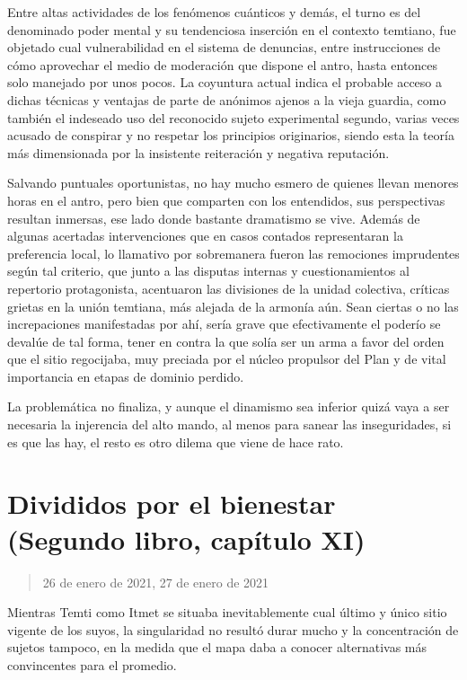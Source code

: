 \documentclass[
]{book}
\begin{document}
Entre altas actividades de los fenómenos cuánticos y demás, el turno es del denominado poder mental y su tendenciosa inserción en el contexto temtiano, fue objetado cual vulnerabilidad en el sistema de denuncias, entre instrucciones de cómo aprovechar el medio de moderación que dispone el antro, hasta entonces solo manejado por unos pocos. La coyuntura actual indica el probable acceso a dichas técnicas y ventajas de parte de anónimos ajenos a la vieja guardia, como también el indeseado uso del reconocido sujeto experimental segundo, varias veces acusado de conspirar y no respetar los principios originarios, siendo esta la teoría más dimensionada por la insistente reiteración y negativa reputación.

Salvando puntuales oportunistas, no hay mucho esmero de quienes llevan menores horas en el antro, pero bien que comparten con los entendidos, sus perspectivas resultan inmersas, ese lado donde bastante dramatismo se vive. Además de algunas acertadas intervenciones que en casos contados representaran la preferencia local, lo llamativo por sobremanera fueron las remociones imprudentes según tal criterio, que junto a las disputas internas y cuestionamientos al repertorio protagonista, acentuaron las divisiones de la unidad colectiva, críticas grietas en la unión temtiana, más alejada de la armonía aún. Sean ciertas o no las increpaciones manifestadas por ahí, sería grave que efectivamente el poderío se devalúe de tal forma, tener en contra la que solía ser un arma a favor del orden que el sitio regocijaba, muy preciada por el núcleo propulsor del Plan y de vital importancia en etapas de dominio perdido.

La problemática no finaliza, y aunque el dinamismo sea inferior quizá vaya a ser necesaria la injerencia del alto mando, al menos para sanear las inseguridades, si es que las hay, el resto es otro dilema que viene de hace rato.

\hypertarget{divididos-por-el-bienestar-segundo-libro-capuxedtulo-xi}{%
\section{Divididos por el bienestar (Segundo libro, capítulo XI)}\label{divididos-por-el-bienestar-segundo-libro-capuxedtulo-xi}}

\begin{quote}
26 de enero de 2021, 27 de enero de 2021
\end{quote}

Mientras Temti como Itmet se situaba inevitablemente cual último y único sitio vigente de los suyos, la singularidad no resultó durar mucho y la concentración de sujetos tampoco, en la medida que el mapa daba a conocer alternativas más convincentes para el promedio.
\end{document}
